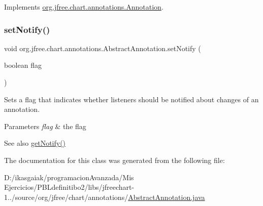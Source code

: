 Implements \mbox{\hyperlink{interfaceorg_1_1jfree_1_1chart_1_1annotations_1_1_annotation_a3ecdf612567af2d1d4cb2344c47db120}{org.\+jfree.\+chart.\+annotations.\+Annotation}}.

\mbox{\label{classorg_1_1jfree_1_1chart_1_1annotations_1_1_abstract_annotation_ab7788a521170bcce474868752965b910}} 
\subsubsection{\texorpdfstring{set\+Notify()}{setNotify()}}
{\footnotesize\ttfamily void org.\+jfree.\+chart.\+annotations.\+Abstract\+Annotation.\+set\+Notify (\begin{DoxyParamCaption}\item[{boolean}]{flag }\end{DoxyParamCaption})}

Sets a flag that indicates whether listeners should be notified about changes of an annotation.


\begin{DoxyParams}{Parameters}
{\em flag} & the flag\\
\hline
\end{DoxyParams}
\begin{DoxySeeAlso}{See also}
\mbox{\hyperlink{classorg_1_1jfree_1_1chart_1_1annotations_1_1_abstract_annotation_a2c22d59758526f591477be87806b537e}{get\+Notify()}} 
\end{DoxySeeAlso}


The documentation for this class was generated from the following file\+:\begin{DoxyCompactItemize}
\item 
D\+:/ikasgaiak/programacion\+Avanzada/\+Mis Ejercicios/\+P\+B\+Ldefinitibo2/libs/jfreechart-\/1../source/org/jfree/chart/annotations/\mbox{\hyperlink{_abstract_annotation_8java}{Abstract\+Annotation.\+java}}\end{DoxyCompactItemize}
